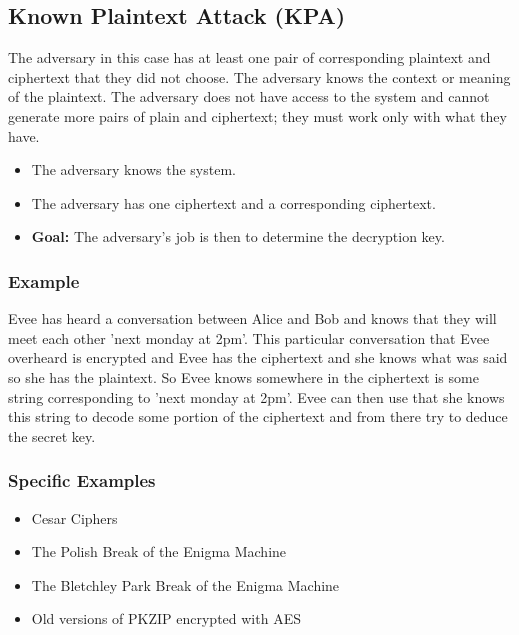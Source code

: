 
\subsection*{Known Plaintext Attack (KPA)}
The adversary in this case has at least one pair of corresponding plaintext and ciphertext that they did not choose.
The adversary knows the context or meaning of the plaintext.
The adversary does not have access to the system and cannot generate more pairs of plain and ciphertext; they must work only with what they have.
\bigskip

\begin{itemize}
\item The adversary knows the system.
\item The adversary has one ciphertext and a corresponding ciphertext.
\item \textbf{Goal:} The adversary’s job is then to determine the decryption key.
\end{itemize}
\bigskip

\subsubsection*{Example}
Evee has heard a conversation between Alice and Bob and knows that they will meet each other 'next monday at 2pm'.
\newline
This particular conversation that Evee overheard is encrypted and Evee has the ciphertext and she knows what was said so she has the plaintext. 
So Evee knows somewhere in the ciphertext is some string corresponding to 'next monday at 2pm'. 
\newline
Evee can then use that she knows this string to decode some portion of the ciphertext and from there try to deduce the secret key. 
\bigskip

\subsubsection*{Specific Examples}
\begin{itemize}
\item Cesar Ciphers
\item The Polish Break of the Enigma Machine
\item The Bletchley Park Break of the Enigma Machine
\item Old versions of PKZIP encrypted with AES
\end{itemize}

